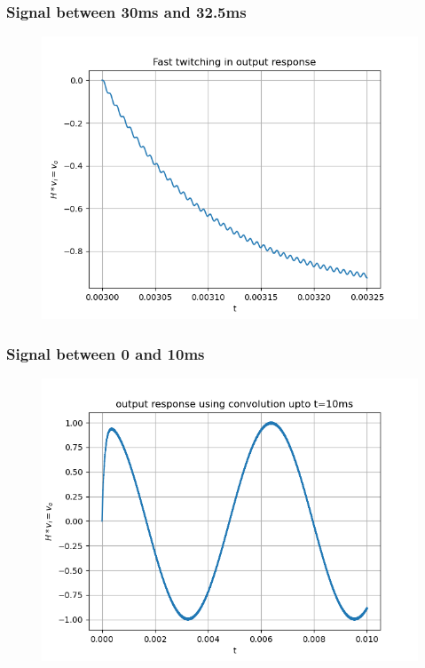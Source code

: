 \documentclass[11pt]{article}
\begin{document}
\subsubsection{Signal between 30ms and 32.5ms}
\begin{figure}[H]
    \centering
    \includegraphics[scale = 1]{Figure_14.png}
\end{figure}

\subsubsection{Signal between 0 and 10ms}
\begin{figure}[H]
    \centering
    \includegraphics[scale = 1]{Figure_12.png}
\end{figure}
\end{document}
